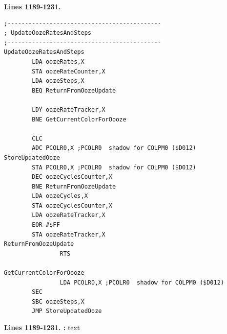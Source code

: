 \clearpage
\textbf{Lines 1189-1231. } 
\begin{lstlisting}
;--------------------------------------------
; UpdateOozeRatesAndSteps
;--------------------------------------------
UpdateOozeRatesAndSteps
        LDA oozeRates,X
        STA oozeRateCounter,X
        LDA oozeSteps,X
        BEQ ReturnFromOozeUpdate

        LDY oozeRateTracker,X
        BNE GetCurrentColorForOooze

        CLC 
        ADC PCOLR0,X ;PCOLR0  shadow for COLPM0 ($D012)
StoreUpdatedOoze
        STA PCOLR0,X ;PCOLR0  shadow for COLPM0 ($D012)
        DEC oozeCyclesCounter,X
        BNE ReturnFromOozeUpdate
        LDA oozeCycles,X
        STA oozeCyclesCounter,X
        LDA oozeRateTracker,X
        EOR #$FF
        STA oozeRateTracker,X
ReturnFromOozeUpdate   
				RTS 

GetCurrentColorForOooze   
				LDA PCOLR0,X ;PCOLR0  shadow for COLPM0 ($D012)
        SEC 
        SBC oozeSteps,X
        JMP StoreUpdatedOoze
\end{lstlisting}
\clearpage

\textbf{Lines 1189-1231. :} 
text

\clearpage
\captionsetup[figure]{font=tiny}

